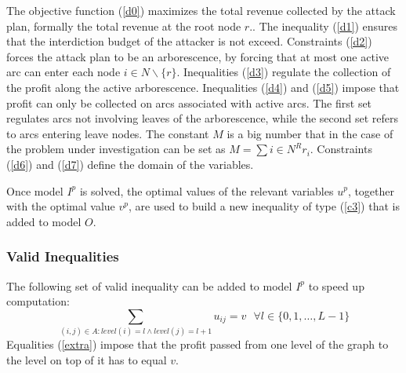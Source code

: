 \documentclass{article}
\begin{document}
The objective function (\ref{d0}) maximizes the total revenue collected by the attack plan, formally the total revenue at the root node $r$..
The inequality (\ref{d1}) ensures that the interdiction budget of the attacker is not exceed.
Constraints  (\ref{d2}) forces the attack plan to be an arborescence, by forcing that at most one active arc can enter each node $i \in N \backslash \{r\}$.
Inequalities (\ref{d3}) regulate the collection of the profit along the active arborescence.
Inequalities (\ref{d4}) and (\ref{d5}) impose that profit can only be collected on arcs associated with active arcs. The first set regulates arcs not involving leaves of the arborescence, while the second set refers to arcs entering leave nodes. The constant $M$ is a big number that in the case of the problem under investigation can be set as $M=\sum{i \in N^R} r_i$.
Constraints (\ref{d6}) and (\ref{d7}) define the domain of the variables.

Once model $I^p$ is solved, the optimal values of the relevant variables $u^p$, together with the optimal value $v^p$, are used to build a new inequality of type (\ref{c3}) that is added to model $O$.

\subsubsection{Valid Inequalities}
The following set of valid inequality can be added to model $I^p$ to speed up computation:
\begin{equation}
\sum_{(i,j) \in A: level(i)=l \land level(j)=l+1} u_{ij}=v \ \ \ \forall l \in \{0, 1, \dots, L-1\} \label{extra}
\end{equation}
Equalities (\ref{extra}) impose that the profit passed from one level of the graph to the level on top of it has to equal $v$.
\end{document}
